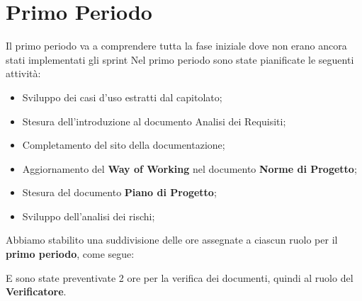 \section{Primo Periodo}

\label{sec:PrimoPeriodo}
Il primo periodo va a comprendere tutta la fase iniziale dove non erano ancora stati implementati gli sprint
Nel primo periodo sono state pianificate le seguenti attività:
\begin{itemize}
    \item Sviluppo dei casi d'uso estratti dal capitolato;
    \item Stesura dell'introduzione al documento Analisi dei Requisiti;
    \item Completamento del sito della documentazione;
    \item Aggiornamento del \textbf{Way of Working} nel documento \textbf{Norme di Progetto};
    \item Stesura del documento \textbf{Piano di Progetto};
    \item Sviluppo dell'analisi dei rischi;
\end{itemize}

Abbiamo stabilito una suddivisione delle ore assegnate a ciascun ruolo per il \textbf{primo periodo}, come segue:  

\begin{table}[H]
    \centering
\end{table}

E sono state preventivate 2 ore per la verifica dei documenti, quindi al ruolo del \textbf{Verificatore}.

